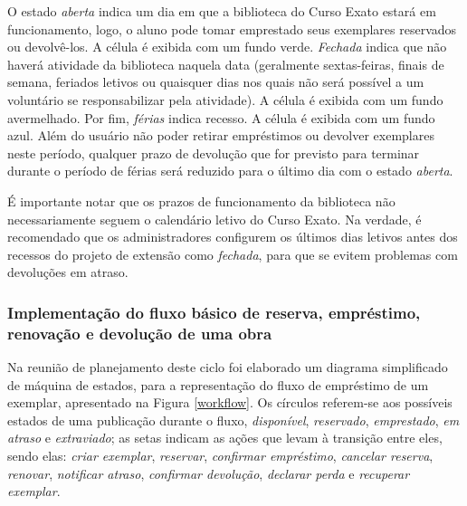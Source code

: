 \documentclass[a4paper]{article}
\begin{document}
O estado \textit{aberta} indica um dia em que a biblioteca do Curso Exato estará em funcionamento, logo, o aluno pode tomar emprestado seus exemplares reservados ou devolvê-los. A célula é exibida com um fundo verde. \textit{Fechada} indica que não haverá atividade da biblioteca naquela data (geralmente sextas-feiras, finais de semana, feriados letivos ou quaisquer dias nos quais não será possível a um voluntário se responsabilizar pela atividade). A célula é exibida com um fundo avermelhado. Por fim, \textit{férias} indica recesso. A célula é exibida com um fundo azul. Além do usuário não poder retirar empréstimos ou devolver exemplares neste período, qualquer prazo de devolução que for previsto para terminar durante o período de férias será reduzido para o último dia com o estado \textit{aberta}.

É importante notar que os prazos de funcionamento da biblioteca não necessariamente seguem o calendário letivo do Curso Exato. Na verdade, é recomendado que os administradores configurem os últimos dias letivos antes dos recessos do projeto de extensão como \textit{fechada}, para que se evitem problemas com devoluções em atraso.

\subsubsection{Implementação do fluxo básico de reserva, empréstimo, renovação e devolução de uma obra} \label{sssec:stransaction}
Na reunião de planejamento deste ciclo foi elaborado um diagrama simplificado de máquina de estados, para a representação do fluxo de empréstimo de um exemplar, apresentado na Figura \ref{workflow}. Os círculos referem-se aos possíveis estados de uma publicação durante o fluxo, \textit{disponível}, \textit{reservado}, \textit{emprestado}, \textit{em atraso} e \textit{extraviado}; as setas indicam as ações que levam à transição entre eles, sendo elas: \textit{criar exemplar}, \textit{reservar}, \textit{confirmar empréstimo}, \textit{cancelar reserva}, \textit{renovar}, \textit{notificar atraso}, \textit{confirmar devolução}, \textit{declarar perda} e \textit{recuperar exemplar}.
\end{document}

